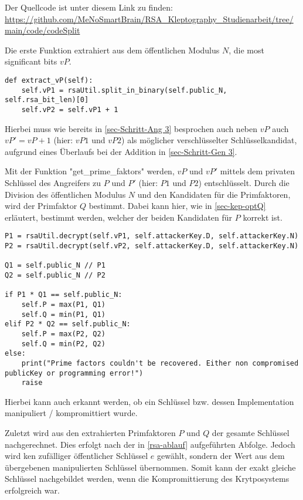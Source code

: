             Der Quellcode ist unter diesem Link zu finden: \url{https://github.com/MeNoSmartBrain/RSA_Kleptography_Studienarbeit/tree/main/code/codeSplit}

            Die erste Funktion extrahiert aus dem öffentlichen Modulus $N$, die most significant bits $vP$.
            \begin{lstlisting}[language=PyBrIM]
def extract_vP(self):
    self.vP1 = rsaUtil.split_in_binary(self.public_N, self.rsa_bit_len)[0]
    self.vP2 = self.vP1 + 1
            \end{lstlisting}
            Hierbei muss wie bereits in \ref{sec-Schritt-Ang 3} besprochen auch neben $vP$ auch $vP' = vP + 1$ (hier: $vP1$ und $vP2$) als möglicher verschlüsselter Schlüsselkandidat, aufgrund eines Überlaufs bei der Addition in \ref{sec-Schritt-Gen 3}.

            Mit der Funktion "get\_prime\_faktors" werden, $vP$ und $vP'$ mittels dem privaten Schlüssel des Angreifers zu $P$ und $P'$ (hier: $P1$ und $P2$) entschlüsselt. Durch die Division des öffentlichen Modulus $N$ und den Kandidaten für die Primfaktoren, wird der Primfaktor $Q$ bestimmt. Dabei kann hier, wie in \ref{sec-kep-optQ} erläutert, bestimmt werden, welcher der beiden Kandidaten für $P$ korrekt ist.

            \begin{lstlisting}[language=PyBrIM]
P1 = rsaUtil.decrypt(self.vP1, self.attackerKey.D, self.attackerKey.N)
P2 = rsaUtil.decrypt(self.vP2, self.attackerKey.D, self.attackerKey.N)

Q1 = self.public_N // P1
Q2 = self.public_N // P2

if P1 * Q1 == self.public_N:
    self.P = max(P1, Q1)
    self.Q = min(P1, Q1)
elif P2 * Q2 == self.public_N:
    self.P = max(P2, Q2)
    self.Q = min(P2, Q2)
else:
    print("Prime factors couldn't be recovered. Either non compromised publicKey or programming error!")
    raise
            \end{lstlisting}
            Hierbei kann auch erkannt werden, ob ein Schlüssel bzw. dessen Implementation manipuliert / kompromittiert wurde.

            Zuletzt wird aus den extrahierten Primfaktoren $P$ und $Q$ der gesamte Schlüssel nachgerechnet. Dies erfolgt nach der in \ref{rsa-ablauf} aufgeführten Abfolge. Jedoch wird ken zufälliger öffentlicher Schlüssel $e$ gewählt, sondern der Wert aus dem übergebenen manipulierten Schlüssel übernommen. Somit kann der exakt gleiche Schlüssel nachgebildet werden, wenn die Kompromittierung des Krytposystems erfolgreich war.
            
